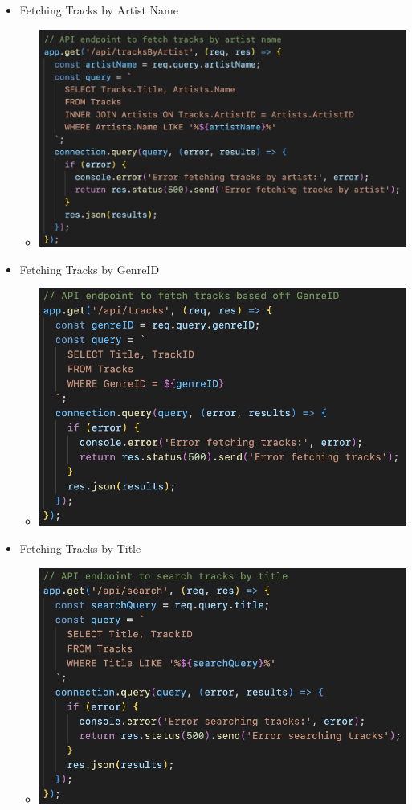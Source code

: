 \documentclass{article}
\begin{document}
\begin{itemize}
\begin{itemize}
				\end{itemize}
				\item Fetching Tracks by Artist Name
				\begin{itemize}
					\item \includegraphics[width=\linewidth]{Queries/fetchTracksByArtistName.png}
				\end{itemize}
				\item Fetching Tracks by GenreID
				\begin{itemize}
					\item \includegraphics[width=\linewidth]{Queries/fetchTracksByGenreID.png}
				\end{itemize}
				\item Fetching Tracks by Title
				\begin{itemize}
					\item \includegraphics[width=\linewidth]{Queries/fetchTracksByTitle.png}

\end{itemize}
\end{itemize}
\end{document}
